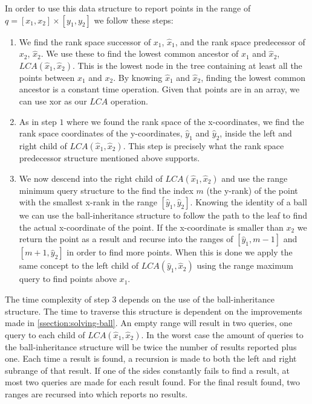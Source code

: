 In order to use this data structure to report points in the range of $q = [x_1, x_2] \times [y_1, y_2]$ we follow these steps:
\begin{enumerate}
  \item We find the rank space successor of $x_1$, $\hat{x}_1$, and the rank space predecessor of $x_2$, $\hat{x}_2$. We use these to find the lowest common ancestor of $\hat{x}_1$ and $\hat{x}_2$, $LCA(\hat{x}_1, \hat{x}_2)$. This is the lowest node in the tree containing at least all the points between $x_1$ and $x_2$. By knowing $\hat{x}_1$ and $\hat{x}_2$, finding the lowest common ancestor is a constant time operation. Given that points are in an array, we can use xor as our $LCA$ operation. 
  \item As in step $1$ where we found the rank space of the x-coordinates, we find the rank space coordinates of the y-coordinates, $\hat{y}_1$ and $\hat{y}_2$, inside the left and right child of $LCA(\hat{x}_1, \hat{x}_2)$. This step is precisely what the rank space predecessor structure mentioned above supports.
  \item We now descend into the right child of $LCA(\hat{x}_1, \hat{x}_2)$ and use the range minimum query structure to the find the index $m$ (the y-rank) of the point with the smallest x-rank in the range $[\hat{y}_1, \hat{y}_2]$. Knowing the identity of a ball we can use the ball-inheritance structure to follow the path to the leaf to find the actual x-coordinate of the point. If the x-coordinate is smaller than $x_2$ we return the point as a result and recurse into the ranges of $[\hat{y}_1, m-1]$ and $[m+1, \hat{y}_2]$ in order to find more points. When this is done we apply the same concept to the left child of $LCA(\hat{y}_1, \hat{x}_2)$ using the range maximum query to find points above $x_1$.
\end{enumerate}


The time complexity of step $3$ depends on the use of the ball-inheritance structure. The time to traverse this structure is dependent on the improvements made in \ref{ssection:solving-ball}. An empty range will result in two queries, one query to each child of $LCA(\hat{x}_1, \hat{x}_2)$. In the worst case the amount of queries to the ball-inheritance structure will be twice the number of results reported plus one. Each time a result is found, a recursion is made to both the left and right subrange of that result. If one of the sides constantly fails to find a result, at most two queries are made for each result found. For the final result found, two ranges are recursed into which reports no results.

